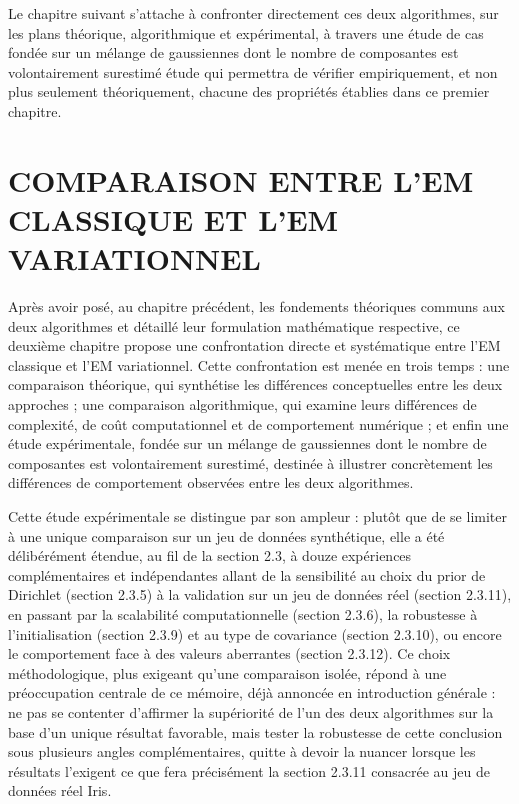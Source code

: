 Le chapitre suivant s'attache à confronter directement ces deux algorithmes, sur les plans théorique, algorithmique et expérimental, à travers une étude de cas fondée sur un mélange de gaussiennes dont le nombre de composantes est volontairement surestimé  étude qui permettra de vérifier empiriquement, et non plus seulement théoriquement, chacune des propriétés établies dans ce premier chapitre.


\chapter{COMPARAISON ENTRE L'EM CLASSIQUE ET L'EM VARIATIONNEL}
Après avoir posé, au chapitre précédent, les fondements théoriques communs aux deux algorithmes et détaillé leur formulation mathématique respective, ce deuxième chapitre propose une confrontation directe et systématique entre l'EM classique et l'EM variationnel. Cette confrontation est menée en trois temps : une comparaison théorique, qui synthétise les différences conceptuelles entre les deux approches ; une comparaison algorithmique, qui examine leurs différences de complexité, de coût computationnel et de comportement numérique ; et enfin une étude expérimentale, fondée sur un mélange de gaussiennes dont le nombre de composantes est volontairement surestimé, destinée à illustrer concrètement les différences de comportement observées entre les deux algorithmes.

Cette étude expérimentale se distingue par son ampleur : plutôt que de se limiter à une unique comparaison sur un jeu de données synthétique, elle a été délibérément étendue, au fil de la section 2.3, à douze expériences complémentaires et indépendantes  allant de la sensibilité au choix du prior de Dirichlet (section 2.3.5) à la validation sur un jeu de données réel (section 2.3.11), en passant par la scalabilité computationnelle (section 2.3.6), la robustesse à l'initialisation (section 2.3.9) et au type de covariance (section 2.3.10), ou encore le comportement face à des valeurs aberrantes (section 2.3.12). Ce choix méthodologique, plus exigeant qu'une comparaison isolée, répond à une préoccupation centrale de ce mémoire, déjà annoncée en introduction générale : ne pas se contenter d'affirmer la supériorité de l'un des deux algorithmes sur la base d'un unique résultat favorable, mais tester la robustesse de cette conclusion sous plusieurs angles complémentaires, quitte à devoir la nuancer lorsque les résultats l'exigent  ce que fera précisément la section 2.3.11 consacrée au jeu de données réel Iris.

